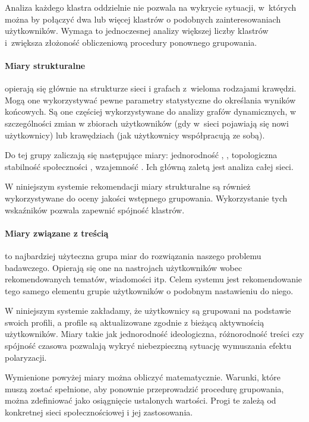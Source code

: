 Analiza każdego klastra oddzielnie nie pozwala na wykrycie sytuacji, w~których można by połączyć dwa lub więcej klastrów o podobnych zainteresowaniach użytkowników. Wymaga to jednoczesnej analizy większej liczby klastrów i~zwiększa złożoność obliczeniową procedury ponownego grupowania.

\paragraph{Miary strukturalne} opierają się głównie na strukturze sieci i grafach z~wieloma rodzajami krawędzi. Mogą one wykorzystywać pewne parametry statystyczne do określania wyników końcowych. Są one częściej wykorzystywane do analizy grafów dynamicznych, w szczególności zmian w zbiorach użytkowników (gdy w~sieci pojawiają się nowi użytkownicy) lub krawędziach (jak użytkownicy współpracują ze sobą).

Do tej grupy zaliczają się następujące miary: jednorodność \cite{lunardi}, \cite{sukiennik}, topologiczna stabilność społeczności \cite{kong}, wzajemność \cite{duskin}. Ich główną zaletą jest analiza całej sieci.

W niniejszym systemie rekomendacji miary strukturalne są również wykorzystywane do oceny jakości wstępnego grupowania. Wykorzystanie tych wskaźników pozwala zapewnić spójność klastrów.

\paragraph{Miary związane z treścią} to najbardziej użyteczna grupa miar do rozwiązania naszego problemu badawczego. Opierają się one na nastrojach użytkowników wobec rekomendowanych tematów, wiadomości itp. Celem systemu jest rekomendowanie tego samego elementu grupie użytkowników o podobnym nastawieniu do niego.

W niniejszym systemie zakładamy, że użytkownicy są grupowani na podstawie swoich profili, a profile są aktualizowane zgodnie z bieżącą aktywnością użytkowników. Miary takie jak jednorodność ideologiczna, różnorodność treści czy spójność czasowa pozwalają wykryć niebezpieczną sytuację wymuszania efektu polaryzacji.

Wymienione powyżej miary można obliczyć matematycznie. Warunki, które muszą zostać spełnione, aby ponownie przeprowadzić procedurę grupowania, można zdefiniować jako osiągnięcie ustalonych wartości. Progi te zależą od konkretnej sieci społecznościowej i jej zastosowania.


